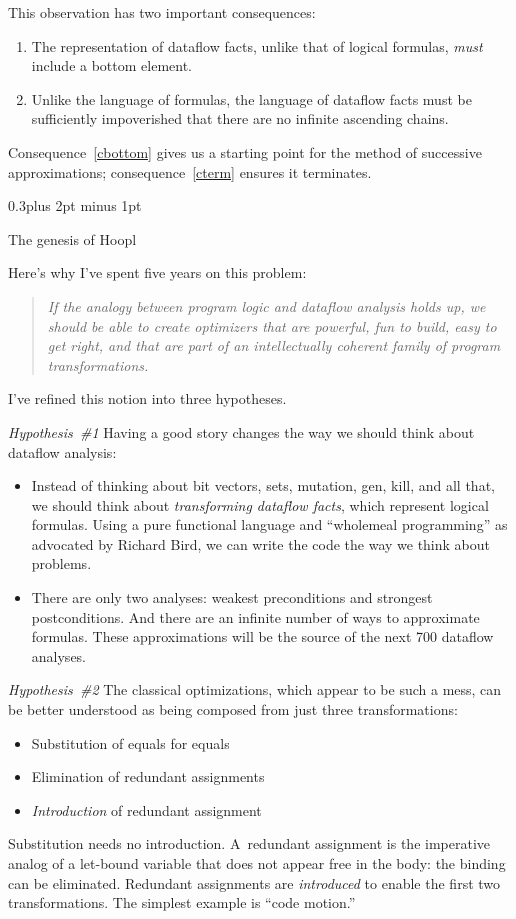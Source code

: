 \documentclass[twocolumn]{article}
\makeatletter
\newcommand\mysection[1]{%
  \par
  \vskip 0.5\baselineskip plus 2pt minus 1pt
  \noindent{\raggedright\textbf{#1}}
  \par
  \vskip 0.3\baselineskip plus 2pt minus 1pt
  \@afterindentfalse
}
\renewcommand\mysection[1]{%
  \@startsection{section}{1}{\z@}{-0.5\baselineskip plus -2pt minus -1pt}%
                                   {0.3\baselineskip plus 2pt minus 1pt}%
           {\normalfont\raggedright\bfseries}}
\makeatother
\begin{document}
This observation has two important consequences:
\begin{enumerate} 
\item
\label{cbottom}
The representation of dataflow facts, unlike that of
logical formulas, \emph{must} include a bottom element.
\item
\label{cterm}
Unlike the language of formulas, 
the language of dataflow facts must be sufficiently impoverished that
there are no infinite ascending chains.
\end{enumerate}
Consequence~\ref{cbottom} gives us a starting point for the method of
successive approximations; consequence~\ref{cterm} ensures it terminates.


\mysection*{The genesis of Hoopl}

Here's why I've spent five years on this problem:
\begin{quote}
\emph{If
the analogy between program logic and dataflow analysis holds up,
we should be able to create optimizers that are powerful, fun to
build, easy to get right, and that are part of an intellectually
coherent family of program transformations.
}
\end{quote}
I've refined this notion into three hypotheses.

\emph{Hypothesis~\#1\quad} 
Having a good story changes the way we should think
about dataflow analysis:
\begin{itemize}
\item
Instead of thinking about bit vectors, sets, mutation, gen, kill, and
all that, we should think about \emph{transforming dataflow facts},
which represent logical formulas.
Using a pure functional language and ``wholemeal programming'' as
advocated by Richard Bird, we can write the code the way we think
about problems.
\item
There are only two analyses: weakest preconditions and strongest
postconditions.
And there are an infinite number of ways to approximate formulas.
These approximations will be the source of the next 700 dataflow
analyses.
\end{itemize}

\emph{Hypothesis~\#2\quad} 
The classical optimizations, which appear to be such a mess, can
be better understood as being composed from just three
transformations:
\begin{itemize}
\item
Substitution of equals for equals
\item
Elimination of redundant assignments
\item
\emph{Introduction} of redundant assignment
\end{itemize}
Substitution needs no introduction.
A~redundant assignment is the imperative analog of a let-bound
variable that does not appear free in the body: the binding can be
eliminated. 
Redundant assignments are \emph{introduced} to enable the first two
transformations. 
The simplest example is ``code motion.''
\end{document}
